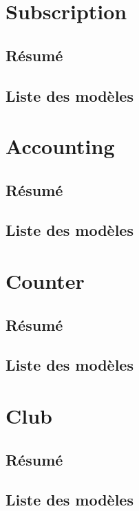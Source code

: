 \documentclass[a4paper]{report}
\begin{document}
\section{Subscription}
\label{sec:subscription}
\subsection{Résumé}
\label{sub:r_sum_}

\subsection{Liste des modèles}
\label{sub:liste_des_mod_les}


\section{Accounting}
\label{sec:accounting}
\subsection{Résumé}
\label{sub:r_sum_}

\subsection{Liste des modèles}
\label{sub:liste_des_mod_les}


\section{Counter}
\label{sec:counter}
\subsection{Résumé}
\label{sub:r_sum_}

\subsection{Liste des modèles}
\label{sub:liste_des_mod_les}


\section{Club}
\label{sec:club}
\subsection{Résumé}
\label{sub:r_sum_}

\subsection{Liste des modèles}
\label{sub:liste_des_mod_les}
\end{document}

